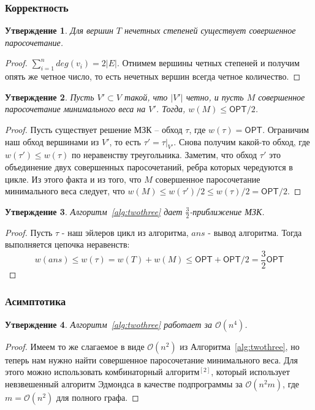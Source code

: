 \documentclass[a4paper,12pt]{article}
\renewcommand{\leq}{\ensuremath{\leqslant}}
\theoremstyle{plain}
\newtheorem{proposition}{Утверждение}[section]
\theoremstyle{definition}
\theoremstyle{remark}
\begin{document}
\subsubsection{Корректность}
\begin{proposition}
    Для вершин $T$ нечетных степеней существует совершенное паросочетание. 
\end{proposition}
\begin{proof}
    $\sum^{n}_{i=1}deg(v_i) = 2|E|$. Отнимем вершины четных степеней и получим опять же четное число, то есть нечетных вершин всегда четное количество.
\end{proof}

\begin{proposition}
    Пусть $V' \subset V$ такой, что $|V'|$ четно, и пусть $M$ совершенное паросочетание минимального веса на $V'$. Тогда, $w(M) \leq \textsf{OPT}/2$.
\end{proposition}
\begin{proof}
    Пусть существует решение МЗК -- обход $\tau$, где $w(\tau) = \textsf{OPT}$. Ограничим наш обход вершинами из $V'$, то есть $\tau' = \tau\vert_{V'}$. Снова получим какой-то обход, где $w(\tau') \leq w(\tau)$ по неравенству треугольника. Заметим, что обход $\tau'$ это объединение двух совершенных паросочетаний, ребра которых чередуются в цикле. Из этого факта и из того, что $M$ совершенное паросочетание минимального веса следует, что $w(M) \leq w(\tau') / 2 \leq w(\tau) / 2 =  \textsf{OPT} / 2$.  
\end{proof}
\begin{proposition}
    Алгоритм~\ref{alg:twothree} дает $\frac{3}{2}$-приближение МЗК.
\end{proposition}

\begin{proof}
    Пусть $\tau$ - наш эйлеров цикл из алгоритма, $ans$ - вывод алгоритма. Тогда выполняется цепочка неравенств:
    $$w(ans) \leq w(\tau) = w(T) + w(M) \leq \textsf{OPT} + \textsf{OPT} / 2 = \frac{3}{2}  \textsf{OPT}$$
\end{proof}

\subsubsection{Асимптотика}
\begin{proposition}
    Алгоритм~\ref{alg:twothree} работает за $\mathcal{O}(n^4)$.
\end{proposition}

\begin{proof}
    Имеем то же слагаемое в виде $\mathcal{O}(n^2)$ из Алгоритма~\ref{alg:twothree}, но теперь нам нужно найти совершенное паросочетание минимального веса. Для этого можно использовать комбинаторный алгоритм\hyperref[litlink2]{$^{[2]}$}, который использует невзвешенный алгоритм Эдмондса в качестве подпрограммы за $\mathcal{O}(n^2m)$, где $m = \mathcal{O}(n^2)$ для полного графа.
\end{proof}
\newpage
\end{document}
